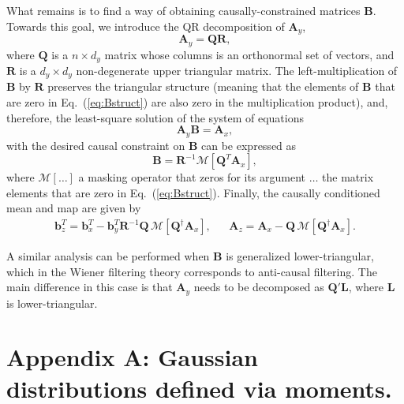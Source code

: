 \documentclass[a4paper,notitlepage]{article}
\renewcommand{\b}[1]{\mathbf{#1}}
\renewcommand{\eqref}[1]{Eq.~(\ref{#1})}
\begin{document}
What remains is to find a way of obtaining causally-constrained matrices $\b{B}$. Towards this goal, we introduce the QR decomposition of $\b{A}_y$,
\begin{equation}
\b{A}_y = \b{Q}\b{R},
\end{equation} 
where $\b{Q}$ is a $n\times d_y$ matrix whose columns is an orthonormal set of vectors, and $\b{R}$ is a $d_y\times d_y$ non-degenerate upper triangular matrix. The left-multiplication of $\b{B}$ by $\b{R}$ preserves the triangular structure (meaning that the elements of $\b{B}$ that are zero in \eqref{eq:Bstruct} are also zero in the multiplication product), and, therefore, the least-square solution of the system of equations
\begin{equation}
\b{A}_y \b{B} = \b{A}_x,
\end{equation}
with the desired causal constraint on $\b{B}$ can be expressed as
\begin{equation}
\b{B}=\b{R}^{-1}\mathcal{M}\left[\b{Q}^T\b{A}_x\right],
\end{equation}
where $\mathcal{M}[\ldots]$ a masking operator that zeros for its argument $\ldots$ the matrix elements that are zero in \eqref{eq:Bstruct}.
Finally, the causally conditioned mean and map are given by
\begin{align}
\b{b}_z^T=\b{b}_{x}^T-\b{b}_y^T \b{R}^{-1}\b{Q}\, \mathcal{M}\left[\b{Q}^\dagger\b{A}_x\right],&&
\b{A}_z =\b{A}_x - \b{Q}\, \mathcal{M}\left[\b{Q}^\dagger\b{A}_x\right].
\end{align}

A similar analysis can be performed when $\b{B}$ is generalized lower-triangular, which in the Wiener filtering theory corresponds to anti-causal filtering. The main difference in this case is that $\b{A}_y$ needs to be decomposed as $\b{Q}'\b{L}$, where $\b{L}$ is lower-triangular. 

\appendix

\setcounter{equation}{0}
\setcounter{figure}{0}
\renewcommand{\theequation}{A\arabic{equation}}
\renewcommand{\thefigure}{A\arabic{figure}}

\section*{Appendix A: Gaussian distributions defined via moments.}\label{sec:refFacts}
\end{document}
